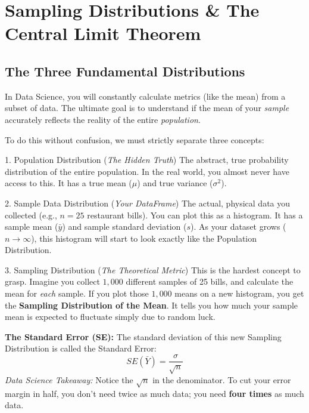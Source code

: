 \section{Sampling Distributions \& The Central Limit Theorem}

\subsection{The Three Fundamental Distributions}
In Data Science, you will constantly calculate metrics (like the mean) from a subset of data. The ultimate goal is to understand if the mean of your \textit{sample} accurately reflects the reality of the entire \textit{population}. 

To do this without confusion, we must strictly separate three concepts:

\begin{defbox}{1. Population Distribution (\textit{The Hidden Truth})}
The abstract, true probability distribution of the entire population. In the real world, you almost never have access to this. It has a true mean ($\mu$) and true variance ($\sigma^2$).
\end{defbox}

\begin{defbox}{2. Sample Data Distribution (\textit{Your DataFrame})}
The actual, physical data you collected (e.g., $n=25$ restaurant bills). You can plot this as a histogram. It has a sample mean ($\bar{y}$) and sample standard deviation ($s$). As your dataset grows ($n \to \infty$), this histogram will start to look exactly like the Population Distribution.
\end{defbox}

\begin{defbox}{3. Sampling Distribution (\textit{The Theoretical Metric})}
This is the hardest concept to grasp. Imagine you collect $1,000$ different samples of 25 bills, and calculate the mean for \textit{each} sample. If you plot those $1,000$ means on a new histogram, you get the \textbf{Sampling Distribution of the Mean}. It tells you how much your sample mean is expected to fluctuate simply due to random luck.
\end{defbox}

\textbf{The Standard Error (SE):} 
The standard deviation of this new Sampling Distribution is called the Standard Error:
\begin{equation}
    SE(\bar{Y}) = \frac{\sigma}{\sqrt{n}}
\end{equation}
\textit{Data Science Takeaway:} Notice the $\sqrt{n}$ in the denominator. To cut your error margin in half, you don't need twice as much data; you need \textbf{four times} as much data.


